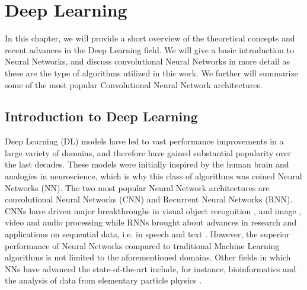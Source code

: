 
\chapter{Deep Learning} %

\label{Chapter3} %


In this chapter, we will provide a short overview of the theoretical concepts and recent advances in the Deep Learning field. We will give a basic introduction to Neural Networks, and discuss convolutional Neural Networks in more detail as these are the type of algorithms utilized in this work. We further will summarize some of the most popular Convolutional Neural Network architectures.




\section{Introduction to Deep Learning}

Deep Learning (DL) models have led to vast performance improvements in a large variety of domains, and therefore have gained substantial popularity over the last decades. These models were initially inspired by the human brain and analogies in neuroscience, which is why this class of algorithms was coined Neural Networks (NN). The two most popular Neural Network architectures are convolutional Neural Networks (CNN) and Recurrent Neural Networks (RNN). CNNs have driven major breakthroughs in visual object recognition \parencite{krizhevsky2012}, and image \parencite{zhang2015}, video \parencite{tompson2014} and audio \parencite{hinton2012} processing while RNNs brought about advances in research and applications on sequential data, i.e. in speech and text \parencite{collobert2011}. However, the superior performance of Neural Networks compared to traditional Machine Learning algorithms is not limited to the aforementioned domains. Other fields in which NNs have advanced the state-of-the-art include, for instance, bioinformatics \parencite{junshui2015} and the analysis of data from elementary particle physics \parencite{ciodaroc2012}.

